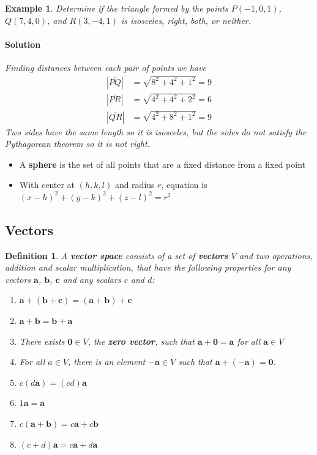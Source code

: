 \documentclass[letterpaper, 11pt, openany]{book}
\theoremstyle{mytheoremstyle}
\newtheorem{definition}{Definition}[section]
\theoremstyle{myexamplestyle}
\newtheorem{example}{Example}[section]
\newenvironment{solution}{\paragraph{\sffamily \smaller \fontseries{b}\selectfont Solution}}{\hfill\faSquare}
\begin{document}
\begin{example}\label{e:3dcoord-triangle}
    Determine if the triangle formed by the points $P(-1, 0 ,1)$, $Q(7, 4, 0)$, and $R(3, -4, 1)$ is isosceles, right, both, or neither.
    \begin{solution}
        Finding distances between each pair of points we have
        \begin{align*}
            |\overline{PQ}| &= \sqrt{8^{2} + 4^{2} + 1^{2}} = 9\\
            |\overline{PR}| &= \sqrt{4^{2} + 4^{2} + 2^{2}} = 6\\
            |\overline{QR}| &= \sqrt{4^{2} + 8^{2} + 1^{2}} = 9
        \end{align*}
        Two sides have the same length so it is isosceles, but the sides do not satisfy the Pythagorean theorem so it is not right.
    \end{solution}
\end{example}

\begin{itemize}
    \item A \textbf{sphere} is the set of all points that are a fixed distance from a fixed point
    \item With center at $(h,k,l)$ and radius $r$, equation is $(x-h)^{2} + (y-k)^{2} + (z-l)^{2} = r^{2}$
\end{itemize}

\subsection{Vectors}

\begin{definition}\label{d:vector-space}
    A \textbf{vector space} consists of a set of \textbf{vectors} $V$ and two operations, addition and scalar multiplication, that have the following properties for any vectors $\mathbf{a}$, $\mathbf{b}$, $\mathbf{c}$ and any scalars $c$ and $d$:
    \begin{enumerate}
        \item $\mathbf{a} + (\mathbf{b} + \mathbf{c}) = (\mathbf{a} + \mathbf{b}) + \mathbf{c}$
        \item $\mathbf{a} + \mathbf{b} = \mathbf{b} + \mathbf{a}$
        \item There exists $\mathbf{0} \in V$, the \textbf{zero vector}, such that $\mathbf{a} + \mathbf{0} = \mathbf{a}$ for all $\mathbf{a} \in V$
        \item For all $a \in V$, there is an element $-\mathbf{a} \in V$ such that $\mathbf{a} + (-\mathbf{a}) = \mathbf{0}$.
        \item $c(d\mathbf{a}) = (cd)\mathbf{a}$
        \item $1\mathbf{a} = \mathbf{a}$
        \item $c(\mathbf{a} + \mathbf{b}) = c\mathbf{a} + c\mathbf{b}$
        \item $(c+d)\mathbf{a} = c\mathbf{a} + d\mathbf{a}$
    \end{enumerate}
\end{definition}
\end{document}
